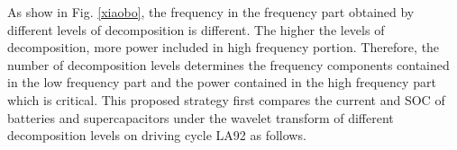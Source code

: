 \documentclass[energies,article,submit,moreauthors,pdftex,10pt,a4paper]{Definitions/mdpi}
\begin{document}
As show in Fig. \ref{xiaobo}, the frequency in the frequency part obtained by different levels of decomposition is different. The higher the levels of decomposition, more power included in high frequency portion. 
Therefore, the number of decomposition levels determines the frequency components contained in the low frequency part and the power contained in the high frequency part which is critical. 
This proposed strategy first compares the current and SOC of batteries and supercapacitors under the wavelet transform of different decomposition levels on driving cycle LA92 as follows.



%
\end{document}
